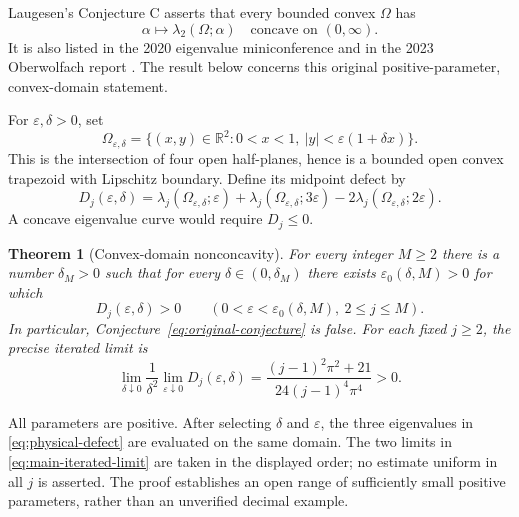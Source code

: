 \documentclass[11pt,a4paper]{article}
\newtheorem{theorem}{Theorem}[section]
\theoremstyle{definition}\newtheorem{definition}[theorem]{Definition}
\theoremstyle{remark}\newtheorem{remark}[theorem]{Remark}
\newcommand{\R}{\mathbb R}
\begin{document}
Laugesen's Conjecture C \cite[Section~2, p.~7]{Laugesen2019}
asserts that every bounded convex $\Omega$ has
\begin{equation}\label{eq:original-conjecture}
 \alpha\longmapsto\lambda_2(\Omega;\alpha)
 \quad\text{concave on }(0,\infty).
\end{equation}
It is also listed in the 2020 eigenvalue miniconference
\cite[Open Problem~7]{Eigenvalues2020} and in the 2023 Oberwolfach
report \cite[p.~2099]{OWR2023}. The result below concerns this
original positive-parameter, convex-domain statement.

For $\varepsilon,\delta>0$, set
\begin{equation}\label{eq:trapezoid}
 \Omega_{\varepsilon,\delta}
 =\{(x,y)\in\R^2:0<x<1,\ |y|<\varepsilon(1+\delta x)\}.
\end{equation}
This is the intersection of four open half-planes, hence is a
bounded open convex trapezoid with Lipschitz boundary. Define its
midpoint defect by
\begin{equation}\label{eq:physical-defect}
 D_j(\varepsilon,\delta)
 =\lambda_j(\Omega_{\varepsilon,\delta};\varepsilon)
  +\lambda_j(\Omega_{\varepsilon,\delta};3\varepsilon)
  -2\lambda_j(\Omega_{\varepsilon,\delta};2\varepsilon).
\end{equation}
A concave eigenvalue curve would require $D_j\leq0$.

\begin{theorem}[Convex-domain nonconcavity]\label{thm:main}
For every integer $M\geq2$ there is a number $\delta_M>0$ such
that for every $\delta\in(0,\delta_M)$ there exists
$\varepsilon_0(\delta,M)>0$ for which
\begin{equation}\label{eq:main-defect}
 D_j(\varepsilon,\delta)>0
 \qquad(0<\varepsilon<\varepsilon_0(\delta,M),\ 2\leq j\leq M).
\end{equation}
In particular, Conjecture~\eqref{eq:original-conjecture} is false.
For each fixed $j\geq2$, the precise iterated limit is
\begin{equation}\label{eq:main-iterated-limit}
 \lim_{\delta\downarrow0}\frac1{\delta^2}
       \lim_{\varepsilon\downarrow0}D_j(\varepsilon,\delta)
 =\frac{(j-1)^2\pi^2+21}{24(j-1)^4\pi^4}>0.
\end{equation}
\end{theorem}

All parameters are positive. After selecting $\delta$ and
$\varepsilon$, the three eigenvalues in
\eqref{eq:physical-defect} are evaluated on the same domain.
The two limits in \eqref{eq:main-iterated-limit} are taken in the
displayed order; no estimate uniform in all $j$ is asserted.
The proof establishes an open range of sufficiently small positive
parameters, rather than an unverified decimal example.
\end{document}
